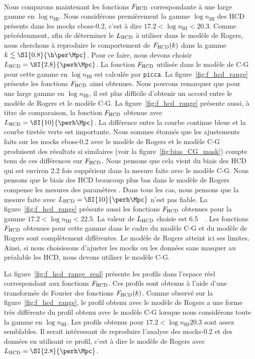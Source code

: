\paragraph{}
Nous comparons maintenant les fonctions $F_{\textsc{HCD}}$ correspondante à une large gamme en $\log n_{\mathrm{HI}}$.
Nous considérons premièrement la gamme $\log n_{\mathrm{HI}}$ des HCD présents dans les mocks eboss-0.2, c'est à dire $\num{17.2} < \log n_{\mathrm{HI}} < \num{20.3}$. Comme précédemment, afin de déterminer le $L_{\textsc{HCD}}$ à utiliser dans le modèle de Rogers, nous cherchons à reproduire le comportement de $F_{\textsc{HCD}}(k)$ dans la gamme $k \lesssim \SI{0.8}{\h\per\Mpc}$. Pour ce faire, nous devons choisir $L_{\textsc{HCD}} = \SI{2.8}{\perh\Mpc}$.
La fonction $F_{\textsc{HCD}}$ utilisée dans le modèle de C-G pour cette gamme en $\log n_{\mathrm{HI}}$ est calculée par \texttt{picca}.
La figure~\ref{fig:f_hcd_range} présente les fonctions $F_{\textsc{HCD}}$ ainsi obtenues. Nous pouvons remarquer que pour une large gamme en $\log n_{\mathrm{HI}}$, il est plus difficile d'obtenir un accord entre le modèle de Rogers et le modèle C-G.
La figure~\ref{fig:f_hcd_range} présente aussi, à titre de comparaison, la  fonction $F_{\textsc{HCD}}$ obtenue avec $L_{\textsc{HCD}} = \SI{10}{\perh\Mpc}$.
La différence entre la courbe continue bleue et la courbe tiretée verte est importante. Nous sommes étonnés que les ajustements faits sur les mocks eboss-0.2 avec le modèle de Rogers et le modèle C-G produisent des résultats si similaires (voir la figure~\ref{fig:bias_CG_mask}) compte tenu de ces différences sur $F_{\textsc{HCD}}$.
Nous pensons que cela vient du biais des HCD qui est environ \num{2.2} fois suppérieur dans la mesure faite avec le modèle C-G. Nous pensons que le biais des HCD beaucoup plus bas dans le modèle de Rogers compense les mesures des paramètres \lya{}. Dans tous les cas, nous pensons que la mesure faite avec $L_{\textsc{HCD}} = \SI{10}{\perh\Mpc}$ n'est pas fiable.
La figure~\ref{fig:f_hcd_range} présente aussi les fonctions $F_{\textsc{HCD}}$ obtenues pour la gamme $\num{17.2} < \log n_{\mathrm{HI}} < \num{22.5}$. La valeur de $L_{\textsc{HCD}}$ choisie est \SI{6.5}{\perh\Mpc}. Les fonctions $F_{\textsc{HCD}}$ obtenues pour cette gamme dans le cadre du modèle C-G et du modèle de Rogers sont complètement différentes. Le modèle de Rogers atteint ici ses limites.
Ainsi, si nous choisissons d'ajuster les mocks ou les données sans masquer au préalable les HCD, nous devons utiliser le modèle C-G.

La figure~\ref{fig:f_hcd_range_real} présente les profils dans l'espace réel correspondant aux fonctions $F_{\textsc{HCD}}$. Ces profils sont obtenus à l'aide d'une transformée de Fourier des fonctions $F_{\textsc{HCD}}(k)$. Comme observé sur la figure~\ref{fig:f_hcd_range}, le profil obtenu avec le modèle de Rogers a une forme très différente du profil obtenu avec le modèle C-G lorsque nous considérons toute la gamme en $\log n_{\mathrm{HI}}$.
Les profils obtenus pour $\num{17.2} < \log n_{\mathrm{HI}} \num{20.3}$ sont assez semblables. Il serait intéressant de reproduire l'analyse des mocks-0.2 et des données en utilisant ce profil, c'est à dire le modèle de Rogers avec $L_{\textsc{HCD}} = \SI{2.8}{\perh\Mpc}$.


